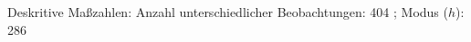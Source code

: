 				\label{tableValues:asys02_g1}
				\vspace*{-\baselineskip}
                    \begin{noten}
                	    \note{} Deskritive Maßzahlen:
                	    Anzahl unterschiedlicher Beobachtungen: 404%
                	    ; 
                	      Modus ($h$): 286
                     \end{noten}


